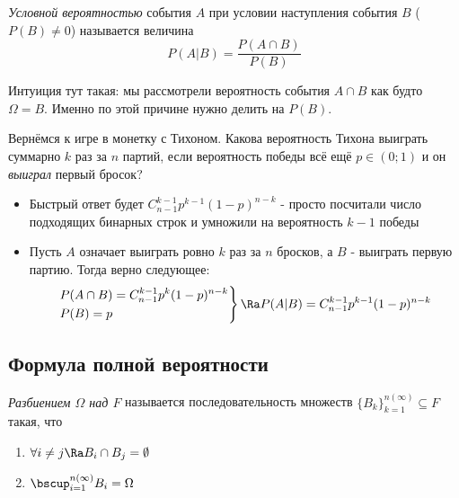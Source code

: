 \begin{definition}
	\textit{Условной вероятностью} события $A$ при условии наступления события $B$ ($P(B) \neq 0$) называется величина
	\[
		P(A | B) = \frac{P(A \cap B)}{P(B)}
	\]
\end{definition}

\begin{note}
	Интуиция тут такая: мы рассмотрели вероятность события $A \cap B$ как будто $\Omega = B$. Именно по этой причине нужно делить на $P(B)$.
\end{note}

\begin{example}
	Вернёмся к игре в монетку с Тихоном. Какова вероятность Тихона выиграть суммарно $k$ раз за $n$ партий, если вероятность победы всё ещё $p \in (0; 1)$ и он \textit{выиграл} первый бросок?
	\begin{itemize}
		\item Быстрый ответ будет $C_{n - 1}^{k - 1} p^{k - 1} (1 - p)^{n - k}$ - просто посчитали число подходящих бинарных строк и умножили на вероятность $k - 1$ победы
		
		\item Пусть $A$ означает выиграть ровно $k$ раз за $n$ бросков, а $B$ - выиграть первую партию. Тогда верно следующее:
		\[
			\left.\begin{aligned}
				&{P(A \cap B) = C_{n - 1}^{k - 1} p^k (1 - p)^{n - k}} 
				\\
				&{P(B) = p}
			\end{aligned}\right\}
			\Ra P(A|B) = C_{n - 1}^{k - 1} p^{k - 1} (1 - p)^{n - k}
		\]
	\end{itemize}
\end{example}

\subsection{Формула полной вероятности}

\begin{definition}
	\textit{Разбиением $\Omega$ над $F$} называется последовательность множеств $\{B_k\}_{k = 1}^{n(\infty)} \subseteq F$ такая, что
	\begin{enumerate}
		\item $\forall i \neq j \Ra B_i \cap B_j = \emptyset$
		
		\item $\bscup_{i = 1}^{n (\infty)} B_i = \Omega$
	\end{enumerate}
\end{definition}

